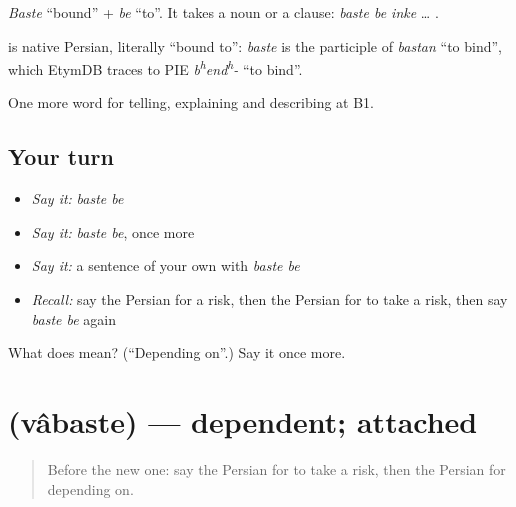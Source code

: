 \emph{Baste} \textquotedblleft{}bound\textquotedblright{} + \emph{be} \textquotedblleft{}to\textquotedblright{}. It takes a noun or a clause: \emph{baste be inke} … .

\begin{cousinweb}
\textbf{ } is native Persian, literally \textquotedblleft{}bound to\textquotedblright{}: \emph{baste} is the participle of \emph{bastan} \textquotedblleft{}to bind\textquotedblright{}, which EtymDB traces to PIE \emph{b\textsuperscript{h}end\textsuperscript{h}-} \textquotedblleft{}to bind\textquotedblright{}.
\end{cousinweb}

\begin{grammarlens}[title={What you've built}]
One more word for telling, explaining and describing at B1.
\end{grammarlens}

\subsection*{Your turn}
\begin{itemize}
\raggedright
  \item \emph{Say it:} \emph{baste be}
  \item \emph{Say it:} \emph{baste be}, once more
  \item \emph{Say it:} a sentence of your own with \emph{baste be}
  \item \emph{Recall:} say the Persian for a risk, then the Persian for to take a risk, then say \emph{baste be} again
\end{itemize}

\begin{tcolorbox}[breakable,colback=teal!4,colframe=teal!35!black,title={Before you move on}]
What does   mean? (\textquotedblleft{}Depending on\textquotedblright{}.) Say it once more.
\end{tcolorbox}
\section[\texorpdfstring{\fa{وابسته} (vâbaste)}{وابسته (vâbaste)}]{ (vâbaste) — dependent; attached}

\label{lesson:FA-C395-vabaste}



\begin{quote}
Before the new one: say the Persian for to take a risk, then the Persian for depending on.
\end{quote}

